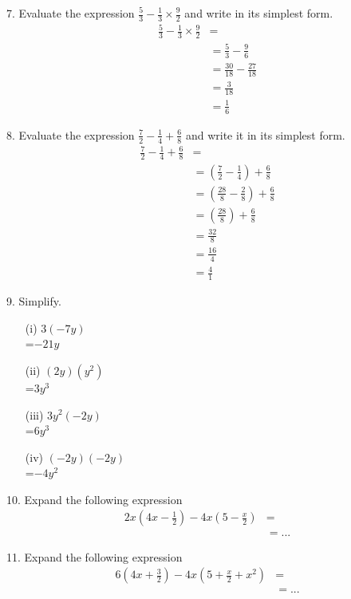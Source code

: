 7. Evaluate the expression $\displaystyle \frac{5}{3} - \frac{1}{3}\times \frac{9}{2}$ and write in its simplest form.
\begin{align*}
    \frac{5}{3} - \frac{1}{3}\times \frac{9}{2} &=\\
    &= \frac{5}{3} - \frac{9}{6}\\
    &= \frac{30}{18} - \frac{27}{18}\\
    &= \frac{3}{18}\\
    &= \frac{1}{6}
\end{align*}

8. Evaluate the expression $\displaystyle \frac{7}{2}-\frac{1}{4}+\frac{6}{8}$ and write it in its simplest form.
\begin{align*}
    \frac{7}{2}-\frac{1}{4}+\frac{6}{8} &=\\
    &= \left(\frac{7}{2} - \frac{1}{4}\right) + \frac{6}{8}\\
    &= \left(\frac{28}{8} - \frac{2}{8}\right) + \frac{6}{8}\\
    &= \left(\frac{28}{8}\right) + \frac{6}{8}\\
    &= \frac{32}{8}\\
    &= \frac{16}{4}\\
    &= \frac{4}{1}
\end{align*}

9. Simplify.
\begin{enumerate}
    \item[(i)] $3(-7y)$\\
    =$-21y$
    \item[(ii)] $(2y)(y^2)$\\
    =$3y^3$
    \item[(iii)] $3y^2(-2y)$\\
    =$6y^3$
    \item[(iv)] $(-2y)(-2y)$\\
    =$-4y^2$
\end{enumerate}

10. Expand the following expression
\begin{align*}
    2x(4x-\frac{1}{2})-4x(5-\frac{x}{2}) &=\\
    &= ...
\end{align*}

11. Expand the following expression
\begin{align*}
    6(4x+\frac{3}{2}) - 4x(5+\frac{x}{2} + x^2) &=\\
    &= ...
\end{align*}

